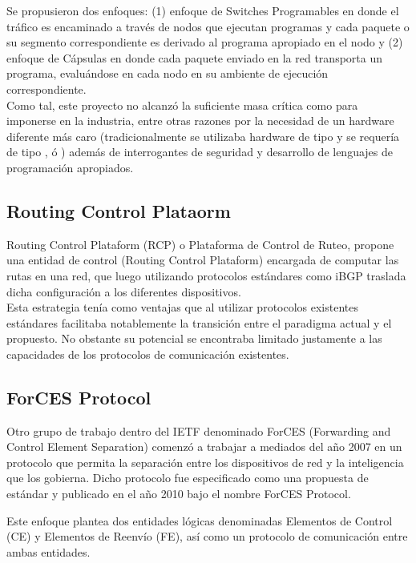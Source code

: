 Se propusieron dos enfoques: (1) enfoque de Switches Programables en donde el tr\'afico es encaminado a través de nodos que ejecutan programas y cada paquete o su segmento correspondiente es derivado al programa apropiado en el nodo y (2) enfoque de C\'apsulas en donde cada paquete enviado en la red transporta un programa, evaluándose en cada nodo en su ambiente de ejecución correspondiente.\\

Como tal, este proyecto no alcanz\'o la suficiente masa cr\'itica como para imponerse en la industria, entre otras razones por la necesidad de un hardware diferente m\'as caro (tradicionalmente se utilizaba hardware de tipo  y se requería de tipo ,  \'o ) adem\'as de interrogantes de seguridad y desarrollo de lenguajes de programación apropiados.

\subsection{Routing Control Plataorm}
Routing Control Plataform (RCP)\citep{feamster2004case}\citep{caesar2005design} o Plataforma de Control de Ruteo, propone una entidad de control (Routing Control Plataform) encargada de computar las rutas en una red, que luego utilizando protocolos estándares como iBGP traslada dicha configuración a los diferentes dispositivos.\\ 

Esta estrategia ten\'ia como ventajas que al utilizar protocolos existentes estándares facilitaba notablemente la transición entre el paradigma actual y el propuesto. No obstante su potencial 
se encontraba limitado justamente a las capacidades de los protocolos de comunicación existentes.

\subsection{ForCES Protocol}
Otro grupo de trabajo dentro del IETF denominado ForCES (Forwarding and Control Element Separation) comenzó a trabajar a mediados del año 2007 en un protocolo que permita la separación entre los dispositivos de red y la inteligencia que los gobierna. Dicho protocolo fue especificado como una propuesta de estándar y publicado en el año 2010 bajo el nombre ForCES Protocol\citep{doria2010forwarding}.

Este enfoque plantea dos entidades lógicas denominadas Elementos de Control (CE) y Elementos de Reenv\'io (FE), así como un protocolo de comunicación entre ambas entidades.


